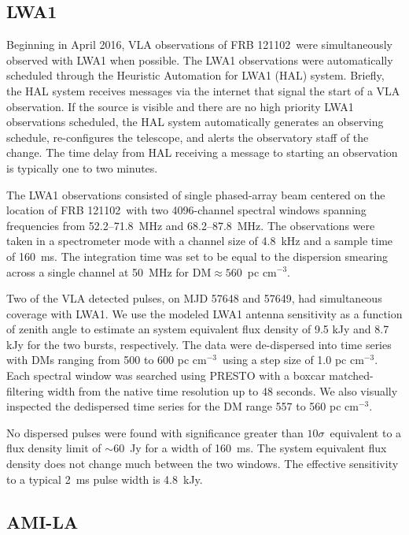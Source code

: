 \documentclass[twocolumn]{aastex61}
\newcommand{\frb}{FRB 121102}
\begin{document}
\subsection{LWA1}

Beginning in April 2016, VLA observations of \frb\ were simultaneously observed with LWA1 when possible.  The LWA1 observations were automatically scheduled through the Heuristic Automation for LWA1 (HAL) system.  Briefly, the HAL system receives messages via the internet that signal the start of a VLA observation. If the source is visible and there are no high priority LWA1 observations scheduled, the HAL system automatically generates an observing schedule, re-configures the telescope, and alerts the observatory staff of the change. The time delay from HAL receiving a message to starting an observation is typically one to two minutes.

The LWA1 observations consisted of single phased-array beam centered on the location of \frb\ with two 4096-channel spectral windows spanning frequencies from 52.2--71.8~MHz and 68.2--87.8~MHz. The observations were taken in a spectrometer mode with a channel size of 4.8~kHz and a sample time of 160~ms. The integration time was set to be equal to the dispersion smearing across a single channel at 50~MHz for DM$\approx560$\ pc cm$^{-3}$. 

Two of the VLA detected pulses, on MJD 57648 and 57649, had simultaneous coverage with LWA1. We use the modeled LWA1 antenna sensitivity as a function of zenith angle to estimate an system equivalent flux density of 9.5 kJy and 8.7 kJy for the two bursts, respectively. The data were de-dispersed into time series with DMs ranging from 500 to 600 pc cm$^{-3}$\ using a step size of 1.0 pc cm$^{-3}$. Each spectral window was searched using PRESTO \citep{2001PhDT.......123R} with a boxcar matched-filtering width from the native time resolution up to 48 seconds. We also visually inspected the dedispersed time series for the DM range 557 to 560 pc cm$^{-3}$.

No dispersed pulses were found with significance greater than $10\sigma$\, equivalent to a flux density limit of $\sim60$\ Jy for a width of 160~ms. The system equivalent flux density does not change much between the two windows. The effective sensitivity to a typical 2~ms pulse width is 4.8~kJy.

\subsection{AMI-LA}
\end{document}

